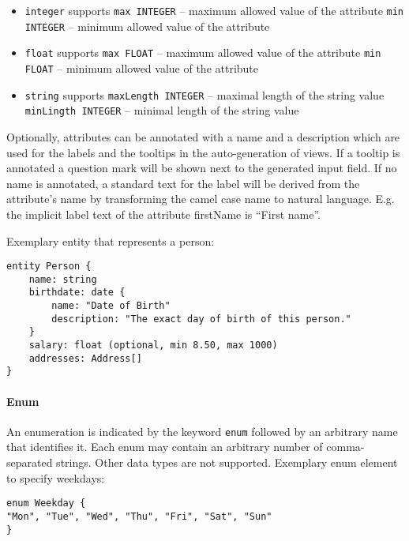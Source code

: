 \begin{itemize}
\item \lstinline!integer! supports
\subitem \lstinline!max INTEGER! – maximum allowed value of the attribute
\subitem \lstinline!min INTEGER! – minimum allowed value of the attribute
\item \lstinline!float! supports
\subitem \lstinline!max FLOAT! – maximum allowed value of the attribute
\subitem \lstinline!min FLOAT! – minimum allowed value of the attribute
\item \lstinline!string! supports
\subitem \lstinline!maxLength INTEGER! – maximal length of the string value
\subitem \lstinline!minLingth INTEGER! – minimal length of the string value
\end{itemize}

Optionally, attributes can be annotated with a name and a description which are used for the labels and the tooltips in the auto-generation of views. If a tooltip is annotated a question mark will be shown next to the generated input field. If no name is annotated, a standard text for the label will be derived from the attribute's name by transforming the camel case name to natural language. E.g. the implicit label text of the attribute firstName is \enquote{First name}.

Exemplary entity that represents a person:
\begin{lstlisting}
entity Person {
	name: string
	birthdate: date {
		name: "Date of Birth"
		description: "The exact day of birth of this person."
	}
	salary: float (optional, min 8.50, max 1000)
	addresses: Address[]
}
\end{lstlisting}

\paragraph{Enum}
An enumeration is indicated by the keyword \lstinline!enum! followed by an arbitrary name that identifies it. Each enum may contain an arbitrary number of comma-separated strings. Other data types are not supported.
Exemplary enum element to specify weekdays:
\begin{lstlisting}
enum Weekday {
"Mon", "Tue", "Wed", "Thu", "Fri", "Sat", "Sun"
}
\end{lstlisting}